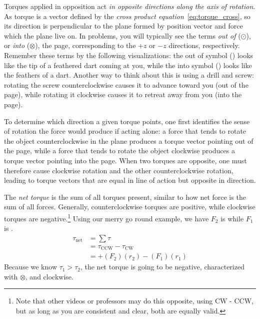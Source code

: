 Torques applied in opposition act \emph{in opposite directions along the axis of rotation}. As torque is a vector defined by the \emph{cross product equation}~\ref{eq:torque_cross}, so its direction is perpendicular to the plane formed by position vector and force which the plane live on. In problems, you will typically see the terms \emph{out of} ($\odot$), or \emph{into} ($\otimes$), the page, corresponding to the $+z$ or $-z$ directions, respectively. Remember these terms by the following visualizations: the out of symbol (\odot) looks like the tip of a feathered dart coming at you, while the into symbol (\otimes) looks like the feathers of a dart. Another way to think about this is using a drill and screw: rotating the screw counterclockwise causes it to advance toward you (out of the page), while rotating it clockwise causes it to retreat away from you (into the page). 

To determine which direction a given torque points, one first identifies the sense of rotation the force would produce if acting alone: a force that tends to rotate the object counterclockwise in the plane produces a torque vector pointing out of the page, while a force that tends to rotate the object clockwise produces a torque vector pointing into the page. When two torques are opposite, one must therefore cause clockwise rotation and the other counterclockwise rotation, leading to torque vectors that are equal in line of action but opposite in direction. 

The \emph{net torque} is the sum of all torques present, similar to how net force is the sum of all forces. Generally, counterclockwise torques are positive, while clockwise torques are negative.\footnote{Note that other videos or professors may do this opposite, using CW - CCW, but as long as you are consistent and clear, both are equally valid.} Using our merry go round example, we have $F_2$ is \odot while $F_1$ is \otimes.
\begin{align*}
    \tau_{\text{net}} &= \sum \tau \\
    &= \tau_\text{CCW} - \tau_\text{CW} \\
    &=+(F_2)(r_2) - (F_1)(r_1)
\end{align*}
Because we know $\tau_1 > \tau_2$, the net torque is going to be negative, characterized with $\otimes$, and clockwise.

